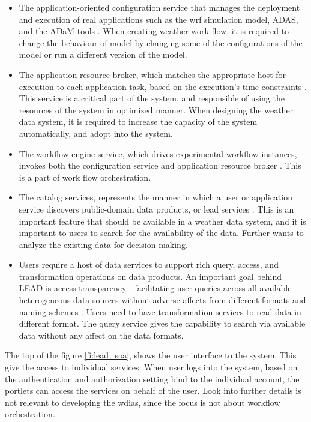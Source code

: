 \begin{itemize}
\item The application-oriented configuration service that manages the deployment and execution of real applications such as the \acrshort{wrf} simulation model, ADAS, and the ADaM tools \cite{Droegemeier2005Service-OrientedWeather}. When creating weather work flow, it is required to change the behaviour of model by changing some of the configurations of the model or run a different version of the model.
\item The application resource broker, which matches the appropriate host for execution to each application task, based on the execution’s time constraints \cite{Droegemeier2005Service-OrientedWeather}. This service is a critical part of the system, and responsible of using the resources of the system in optimized manner. When designing the weather data system, it is required to increase the capacity of the system automatically, and adopt into the system.
\item The workflow engine service, which drives experimental workflow instances, invokes both the configuration service and application resource broker \cite{Droegemeier2005Service-OrientedWeather}. This is a part of work flow orchestration.
\item The catalog services, represents the manner in which a user or application service discovers public-domain data products, or \acrshort{lead} services \cite{Droegemeier2005Service-OrientedWeather}. This is an important feature that should be available in a weather data system, and it is important to users to search for the availability of the data. Further wants to analyze the existing data for decision making.
\item Users require a host of data services to support rich query, access, and transformation operations on data products. An important goal behind LEAD is access transparency—facilitating user queries across all available heterogeneous data sources without adverse affects from different formats and naming schemes \cite{Droegemeier2005Service-OrientedWeather}. Users need to have transformation services to read data in different format. The query service gives the capability to search via available data without any affect on the data formats.
\end{itemize}
The top of the figure \ref{fi:lead_soa}, shows the user interface to the system. This give the access to individual services. When user logs into the system, based on the authentication and authorization setting bind to the individual account, the portlets can access the services on behalf of the user. Look into further details is not relevant to developing the \acrshort{wdias}, since the focus is not about workflow orchestration.

